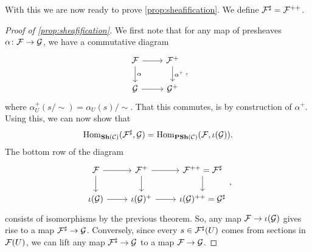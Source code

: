 \documentclass{article}
\begin{document}
With this we are now ready to prove \cref{prop:sheafification}.
We define $\mathcal{F}^\sharp = \mathcal{F}^{++}$.
\begin{proof}[Proof of \cref{prop:sheafification}]
    We first note that for any map of presheaves $\alpha\colon \mathcal{F} \to \mathcal{G}$,
    we have a commutative diagram
    \begin{equation*}
        \begin{tikzcd}
            \mcF \rar \dar["\alpha"] & \mcF^+ \dar["\alpha^+"] \\
            \mcG \rar & \mcG^+
        \end{tikzcd},
    \end{equation*}
    where $\alpha^+_U(s/ \sim) = \alpha_U(s)/\sim$.
    That this commutes, is by construction of $\alpha^+$.
    Using this, we can now show that
    \begin{equation*}
        \operatorname{Hom}_{\operatorname{\mathbf{Sh}}(\mathcal{C})}(\mathcal{F}^\sharp, \mathcal{G}) = \operatorname{Hom}_{\operatorname{\mathbf{PSh}}(\mathcal{C})}(\mathcal{F}, \iota(\mathcal{G})).
    \end{equation*}
    The bottom row of the diagram
    \begin{equation*}
        \begin{tikzcd}
            \mcF \rar \dar &\mcF^+ \dar \rar & \mcF^{++} = \mcF^{\sharp} \dar \\
            \iota(\mcG) \rar  &\iota(\mcG)^+  \rar & \iota(\mcG)^{++} = \mcG^{\sharp}
        \end{tikzcd}
        ,
    \end{equation*}
    consists of isomorphisms by the previous theorem.
    So, any map $\mathcal{F} \to \iota(\mathcal{G})$ gives rise to a map
    $\mathcal{F}^\sharp \to \mathcal{G}$.
    Conversely, since every $s\in \mathcal{F}^\sharp(U)$ comes from sections
    in $\mathcal{F}(U)$, we can lift any map $\mathcal{F}^\sharp \to \mathcal{G}$
    to a map $\mathcal{F} \to \mathcal{G}$.
\end{proof}
\end{document}

